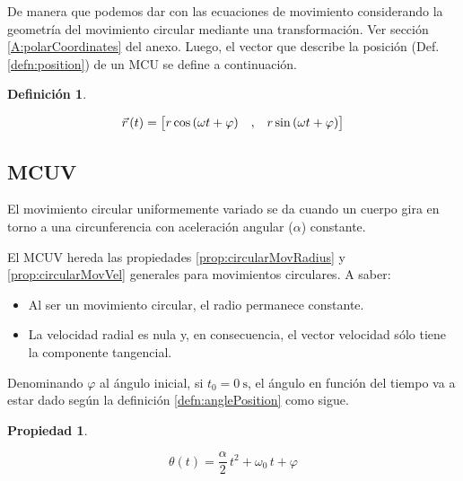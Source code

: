 \documentclass[a5paper,12pt,twoside]{book}
\newtheorem{defn}{{Definición}}[chapter]
\newtheorem{prop}{{Propiedad}}[chapter]
\begin{document}
De manera que podemos dar con las ecuaciones de movimiento considerando la geometría del movimiento circular mediante una transformación.
Ver sección \ref{A:polarCoordinates} del anexo.
Luego, el vector que describe la posición (Def. \ref{defn:position}) de un MCU se define a continuación.

\begin{mdframed}[style=MyFrame1]
    \begin{defn}
        \label{defn:MCUmovementEqns}
    \end{defn}
    \begin{equation*}
        \vec{r}\hspace{0.05cm}(t) = { \begin{bmatrix} r \cos{(\omega t + \varphi)} &,& r \sin{(\omega t + \varphi)} \end{bmatrix} }
    \end{equation*}
\end{mdframed}


\subsection{MCUV}

El movimiento circular uniformemente variado se da cuando un cuerpo gira en torno a una circunferencia con aceleración angular ($\alpha$) constante.

El MCUV hereda las propiedades \ref{prop:circularMovRadius} y \ref{prop:circularMovVel} generales para movimientos circulares.
A saber:
\begin{itemize}
    \item Al ser un movimiento circular, el radio permanece constante.
    
    \item La velocidad radial es nula y, en consecuencia, el vector velocidad sólo tiene la componente tangencial.
\end{itemize}

Denominando $\varphi$ al ángulo inicial, si $t_0=\SI{0}{\second}$, el ángulo en función del tiempo va a estar dado según la definición \ref{defn:anglePosition} como sigue.

\begin{mdframed}[style=MyFrame1]
    \begin{prop}
    \end{prop}
    \begin{equation*}
        \theta (t) = \frac{\alpha}{2} \, t^2 + \omega_0 \, t + \varphi
    \end{equation*}
\end{mdframed}
\end{document}
